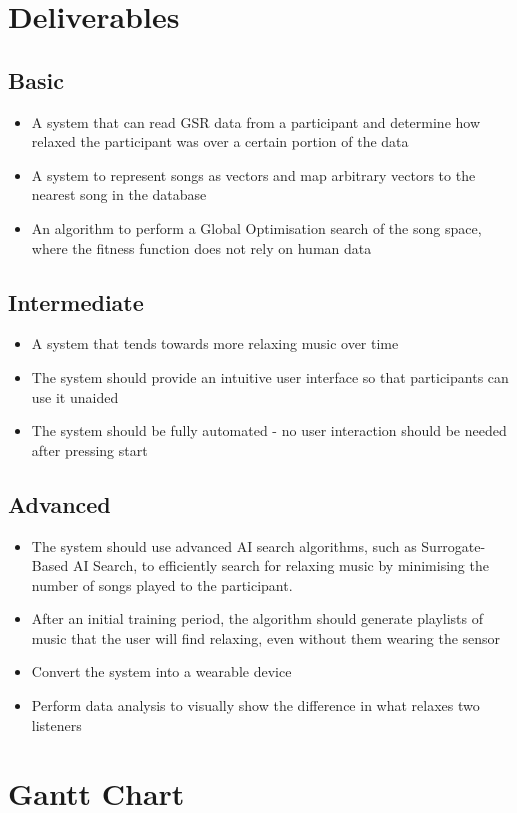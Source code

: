 \documentclass{article}
\begin{document}
	
	\section{Deliverables}
	\subsection{Basic}
	\begin{itemize}
		\item A system that can read GSR data from a participant and determine how relaxed the participant was over a certain portion of the data
		\item A system to represent songs as vectors and map arbitrary vectors to the nearest song in the database
		\item An algorithm to perform a Global Optimisation search of the song space, where the fitness function does not rely on human data
	\end{itemize}
	
	\subsection{Intermediate}
	\begin{itemize}
		\item A system that tends towards more relaxing music over time
		\item The system should provide an intuitive user interface so that participants can use it unaided
		\item The system should be fully automated - no user interaction should be needed after pressing start
	\end{itemize}
	
	\subsection{Advanced}
	\begin{itemize}
		\item The system should use advanced AI search algorithms, such as Surrogate-Based AI Search, to efficiently search for relaxing music by minimising the number of songs played to the participant.
		\item After an initial training period, the algorithm should generate playlists of music that the user will find relaxing, even without them wearing the sensor
		\item Convert the system into a wearable device
		\item Perform data analysis to visually show the difference in what relaxes two listeners
	\end{itemize}
	
	\section{Gantt Chart}
	
	
\end{document}
